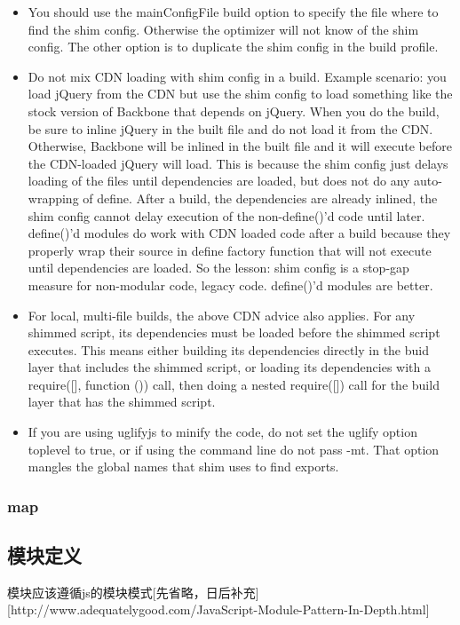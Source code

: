 \begin{itemize}
\item You should use the mainConfigFile build option to specify the file where to find the shim config. Otherwise the optimizer will not know of the shim config. The other option is to duplicate the shim config in the build profile.
\item Do not mix CDN loading with shim config in a build. Example scenario: you load jQuery from the CDN but use the shim config to load something like the stock version of Backbone that depends on jQuery. When you do the build, be sure to inline jQuery in the built file and do not load it from the CDN. Otherwise, Backbone will be inlined in the built file and it will execute before the CDN-loaded jQuery will load. This is because the shim config just delays loading of the files until dependencies are loaded, but does not do any auto-wrapping of define. After a build, the dependencies are already inlined, the shim config cannot delay execution of the non-define()'d code until later. define()'d modules do work with CDN loaded code after a build because they properly wrap their source in define factory function that will not execute until dependencies are loaded. So the lesson: shim config is a stop-gap measure for non-modular code, legacy code. define()'d modules are better.
\item For local, multi-file builds, the above CDN advice also applies. For any shimmed script, its dependencies must be loaded before the shimmed script executes. This means either building its dependencies directly in the buid layer that includes the shimmed script, or loading its dependencies with a require([], function (){}) call, then doing a nested require([]) call for the build layer that has the shimmed script.
\item If you are using uglifyjs to minify the code, do not set the uglify option toplevel to true, or if using the command line do not pass -mt. That option mangles the global names that shim uses to find exports.
\end{itemize}


\subsubsection{map}



\subsection{模块定义}
模块应该遵循js的模块模式[先省略，日后补充][http://www.adequatelygood.com/JavaScript-Module-Pattern-In-Depth.html]

